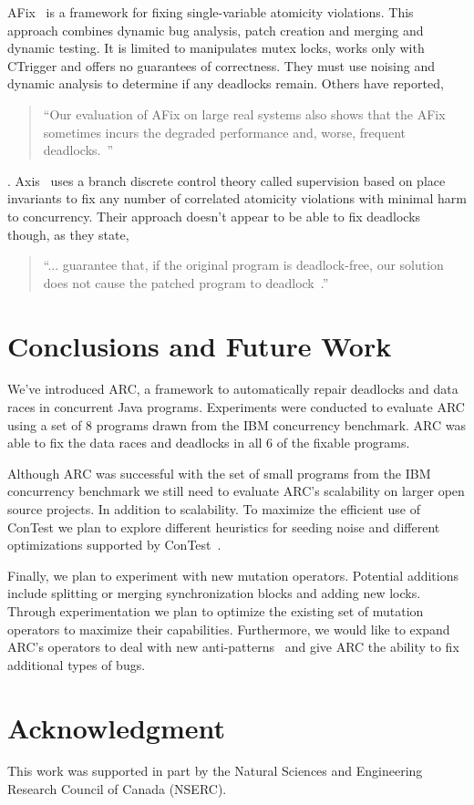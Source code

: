 \documentclass[runningheads,a4paper]{llncs}
\begin{document}
AFix~\cite{JSZL+11} is a framework for fixing single-variable atomicity violations. This approach combines dynamic bug analysis, patch creation and merging and dynamic testing. It is limited to manipulates mutex locks, works only with CTrigger and offers no guarantees of correctness.  They must use noising and dynamic analysis to determine if any deadlocks remain.  
Others have reported, \begin{quote}``Our evaluation of AFix on large real systems also shows that the AFix sometimes incurs the degraded performance and, worse, frequent deadlocks.~\cite{LZ12}''\end{quote}. Axis~\cite{LZ12} uses a branch discrete control theory called supervision based on place invariants to fix any number of correlated atomicity violations with minimal harm to concurrency. Their approach doesn't appear to be able to fix deadlocks though, as they state,  \begin{quote}``... guarantee that, if the original program is deadlock-free, our solution does not cause the patched program to deadlock~\cite{LZ12}.''\end{quote}

\section{Conclusions and Future Work}
\label{sec:conclusion}

We've introduced ARC, a framework to automatically repair deadlocks and data races in concurrent Java programs. Experiments were conducted to evaluate ARC using a set of 8 programs drawn from the IBM concurrency benchmark. ARC was able to fix the data races and deadlocks in all 6 of the fixable programs.

Although ARC was successful with the set of small programs from the IBM concurrency benchmark we still need to evaluate ARC's scalability on larger open source projects. In addition to scalability. To maximize the efficient use of ConTest we plan to explore different heuristics for seeding noise and different optimizations supported by ConTest~\cite{KLVU10}.

Finally, we plan to experiment with new mutation operators. Potential additions include splitting or merging synchronization blocks and adding new locks. Through experimentation we plan to optimize the existing set of mutation operators to maximize their capabilities.  Furthermore, we would like to expand ARC's operators to deal with new anti-patterns~\cite{BJ09, FKLV12, BCD06} and give ARC the ability to fix additional types of bugs.

\section*{Acknowledgment}


This work was supported in part by the Natural Sciences and Engineering Research Council of Canada (NSERC). 



\end{document}
